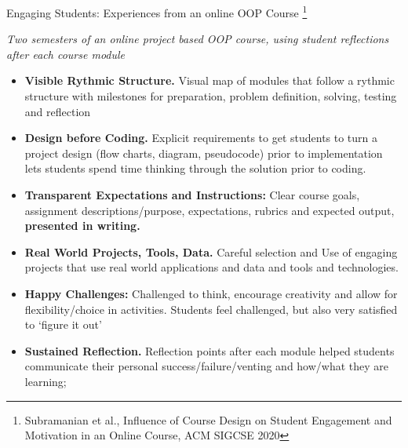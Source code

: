 \documentclass[aspectratio=169]{beamer}
\begin{document}
\begin{frame}{Engaging Students: Experiences from an online OOP Course
\footnote{Subramanian et al., Influence of Course Design on Student Engagement and Motivation in an Online Course, ACM SIGCSE 2020}}
\begin{block}{\sl Two semesters of an online  project based OOP course, using
student  reflections after each course module}
{ \small
\begin{itemize} 
\item \textbf{Visible Rythmic Structure.} Visual map of modules that follow a rythmic 
	structure with milestones for preparation, problem definition, solving, testing  and
	reflection
\item \textbf{Design before Coding.} Explicit requirements to get students to turn
a project design (flow charts, diagram, pseudocode) prior to implementation lets students
spend time thinking through the solution prior to coding.
\item \textbf{Transparent Expectations and Instructions:} Clear course goals, assignment
descriptions/purpose, expectations, rubrics and expected output, \textbf{presented in writing.}
\item \textbf{Real World Projects, Tools, Data.} Careful selection and Use of 
engaging projects that use real world applications and data and tools and technologies.
\item \textbf{Happy Challenges:} Challenged to think, encourage  creativity and 
allow for flexibility/choice in activities. Students feel challenged, but also very satisfied
to `figure it out'
\item \textbf{Sustained Reflection.} Reflection points after each module helped students
communicate their personal success/failure/venting and how/what they are learning;
\end{itemize}
}
\end{block}
\end{frame}
\end{document}

